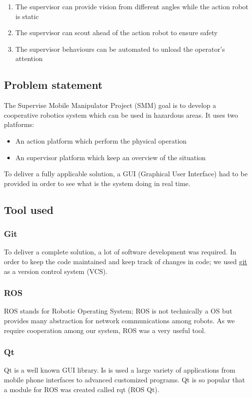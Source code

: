 \documentclass[11pt,a4paper]{article}
\begin{document}
\begin{enumerate}
\item The supervisor can provide vision from different angles while the action robot is static
\item The supervisor can scout ahead of the action robot to ensure safety
\item The supervisor behaviours can be automated to unload the operator's attention
\end{enumerate}


\subsection{Problem statement}
The Supervise Mobile Manipulator Project (SMM) goal is to develop a cooperative robotics
system which can be used in hazardous areas. It uses two platforms: 

\begin{itemize}
\item An action platform which perform the physical operation
\item An supervisor platform which keep an overview of the situation
\end{itemize}

To deliver a fully applicable solution, a GUI (Graphical User Interface) had to be provided in
order to see what is the system doing in real time.


\subsection{Tool used}
\subsubsection{Git}
To deliver a complete solution, a lot of software development was required. In order to keep
the code maintained and keep track of changes in code; we used \href{https://git-scm.com/}{git} as a version control system
 (VCS).
\subsubsection{ROS} \label{ROS}
ROS stands for Robotic Operating System; ROS is not technically a OS but provides many abstraction for network communications among robots. As we require cooperation among our 
system, ROS was a very useful tool.
\subsubsection{Qt}
Qt is a well known GUI library. Is is used a large variety of applications from mobile phone interfaces to advanced customized programs. Qt is so popular that a module for ROS was
created called rqt (ROS Qt).
\end{document}
